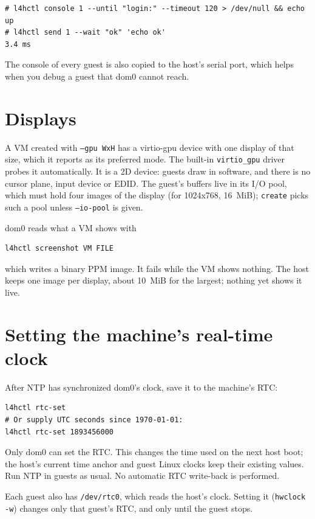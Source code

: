 \documentclass[11pt,a4paper]{report}
\newcommand{\cmd}[1]{\texttt{#1}}
\begin{document}
\begin{lstlisting}
# l4hctl console 1 --until "login:" --timeout 120 > /dev/null && echo up
# l4hctl send 1 --wait "ok" 'echo ok'
3.4 ms
\end{lstlisting}

The console of every guest is also copied to the host's serial port, which
helps when you debug a guest that dom0 cannot reach.

\section{Displays}
\label{sec:display}

A VM created with \texttt{--gpu WxH} has a virtio-gpu device with one
display of that size, which it reports as its preferred mode. The built-in
\texttt{virtio\_gpu} driver probes it automatically.
It is a 2D device: guests draw in software, and there is no cursor plane,
input device or EDID. The guest's buffers live in its I/O pool, which
must hold four images of the display (for 1024x768, 16~MiB);
\cmd{create} picks such a pool unless \texttt{--io-pool} is given.

dom0 reads what a VM shows with
\begin{lstlisting}
l4hctl screenshot VM FILE
\end{lstlisting}
which writes a binary PPM image. It fails while the VM shows nothing. The
host keeps one image per display, about 10~MiB for the largest; nothing
yet shows it live.

\section{Setting the machine's real-time clock}

After NTP has synchronized dom0's clock, save it to the machine's RTC:
\begin{lstlisting}
l4hctl rtc-set
# Or supply UTC seconds since 1970-01-01:
l4hctl rtc-set 1893456000
\end{lstlisting}

Only dom0 can set the RTC. This changes the time used on the next host
boot; the host's current time anchor and guest Linux clocks keep their
existing values. Run NTP in guests as usual. No automatic RTC write-back
is performed.

Each guest also has \texttt{/dev/rtc0}, which reads the host's clock.
Setting it (\texttt{hwclock -w}) changes only that guest's RTC, and only
until the guest stops.
\end{document}

